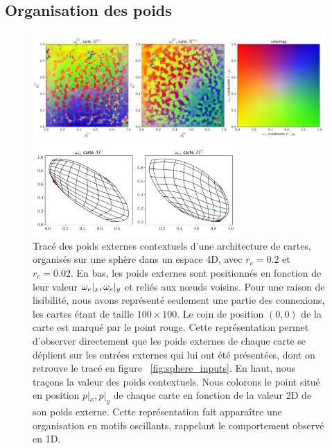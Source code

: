 \documentclass[../main]{subfiles}
\begin{document}
\subsection{Organisation des poids}

\begin{figure}[h!]
	\begin{minipage}{\textwidth}
	\includegraphics[width=\textwidth]{wc_rc002_afterbug_nopoints.pdf}
	\end{minipage}
	\begin{minipage}{\textwidth}
		\includegraphics[width=0.7\textwidth]{we_rc002_afterbug_step10.pdf}
		\caption{Tracé des poids externes contextuels d'une architecture de cartes, organisés sur une sphère dans un espace 4D, avec $r_e =0.2$ et $r_c = 0.02$.
		En bas, les poids externes sont positionnés en fonction de leur valeur $\omega_e|_x, \omega_e|_y$ et reliés aux n\oe{}uds voisins. Pour une raison de lisibilité, nous avons représenté seulement une partie des connexions, les cartes étant de taille $100 \times 100$. Le coin de position $(0,0)$ de la carte est marqué par le point rouge. Cette représentation permet d'observer directement que les poids externes de chaque carte se déplient sur les entrées externes qui lui ont été présentées, dont on retrouve le tracé en figure ~\ref{fig:sphere_inputs}.
		En haut, nous traçons la valeur des poids contextuels. Nous colorons le point situé en position $p|_x, p|_y$ de chaque carte en fonction de la valeur 2D de son poids externe. Cette représentation fait apparaître une organisation en motifs oscillants, rappelant le comportement observé en 1D.
		\label{fig:2som_s_002_wc}}
		\end{minipage}
\end{figure}
\end{document}
